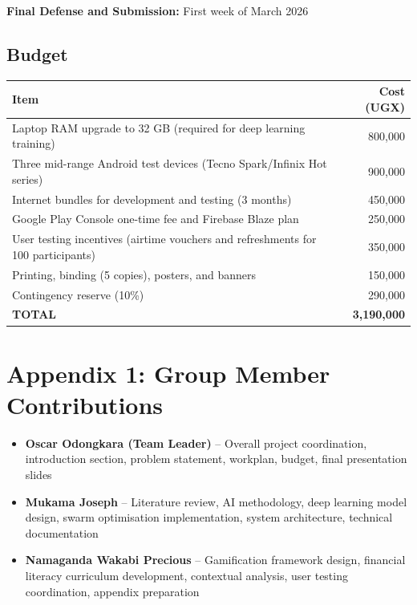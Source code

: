 \documentclass[12pt]{article}
\begin{document}
\textbf{Final Defense and Submission:} First week of March 2026

\subsection{\large Budget}

\begin{center}
\begin{tabular}{|p{10.5cm}|r|}
\hline
\textbf{\large Item} & \textbf{\large Cost (UGX)} \\
\hline
Laptop RAM upgrade to 32 GB (required for deep learning training) & 800,000 \\
\hline
Three mid-range Android test devices (Tecno Spark/Infinix Hot series) & 900,000 \\
\hline
Internet bundles for development and testing (3 months) & 450,000 \\
\hline
Google Play Console one-time fee and Firebase Blaze plan & 250,000 \\
\hline
User testing incentives (airtime vouchers and refreshments for 100 participants) & 350,000 \\
\hline
Printing, binding (5 copies), posters, and banners & 150,000 \\
\hline
Contingency reserve (10\%) & 290,000 \\
\hline
\textbf{TOTAL} & \textbf{3,190,000} \\
\hline
\end{tabular}
\end{center}

\clearpage

\newpage
\section*{\large Appendix 1: Group Member Contributions}
\begin{itemize}
    \item \textbf{Oscar Odongkara (Team Leader)} – Overall project coordination, introduction section, problem statement, workplan, budget, final presentation slides
    \item \textbf{Mukama Joseph} – Literature review, AI methodology, deep learning model design, swarm optimisation implementation, system architecture, technical documentation
    \item \textbf{Namaganda Wakabi Precious} – Gamification framework design, financial literacy curriculum development, contextual analysis, user testing coordination, appendix preparation
\end{itemize}
\end{document}
